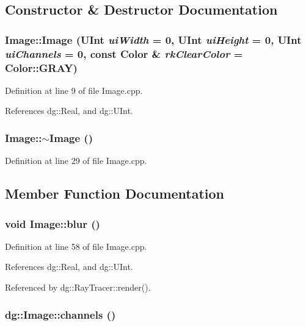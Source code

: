 \subsection{Constructor \& Destructor Documentation}
\subsubsection{\setlength{\rightskip}{0pt plus 5cm}Image::Image ({\bf UInt} {\em ui\-Width} = 0, {\bf UInt} {\em ui\-Height} = 0, {\bf UInt} {\em ui\-Channels} = 0, const {\bf Color} \& {\em rk\-Clear\-Color} = {\bf Color::GRAY})}\label{classdg_1_1Image_a0}




Definition at line 9 of file Image.cpp.

References dg::Real, and dg::UInt.
\subsubsection{\setlength{\rightskip}{0pt plus 5cm}Image::$\sim$Image ()}\label{classdg_1_1Image_a1}




Definition at line 29 of file Image.cpp.

\subsection{Member Function Documentation}
\subsubsection{\setlength{\rightskip}{0pt plus 5cm}void Image::blur ()}\label{classdg_1_1Image_a23}




Definition at line 58 of file Image.cpp.

References dg::Real, and dg::UInt.

Referenced by dg::Ray\-Tracer::render().
\subsubsection{ dg::Image::channels ()\hspace{0.3cm}{\tt  [inline]}}\label{classdg_1_1Image_a10}




